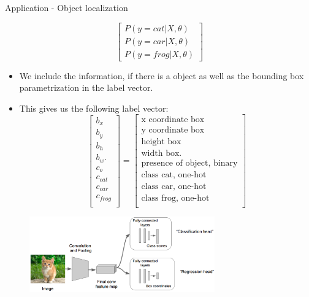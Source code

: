\begin{vbframe}{Application - Object localization}
\begin{itemize}
$$            \begin{bmatrix}
            P(y = cat| X, \theta)\\
            P(y = car| X, \theta)\\
            P(y = frog| X, \theta)
            \end{bmatrix}
            $$
                \end{itemize}
            \framebreak
            \begin{itemize}
            \item We include the information, if there is a object as well as the bounding box parametrization in the label vector.
            \item This gives us the following label vector:
                $$
                \begin{bmatrix}
            b_x\\
            b_y \\
            b_h \\
            b_w.\\
            c_o \\
            c_{cat} \\
            c_{car} \\
            c_{frog} \\
            \end{bmatrix} =             
                \begin{bmatrix}
            \text{x coordinate box}\\
            \text{y coordinate box} \\
            \text{height box} \\
            \text{width box}.\\
            \text{presence of object, binary} \\
            \text{class cat, one-hot} \\
            \text{class car, one-hot}\\
            \text{class frog, one-hot} \\
            \end{bmatrix}
            $$
                \end{itemize}
            \framebreak
            \begin{figure}
            \centering
            \includegraphics[width=8cm]{figure/naive_localization.png}

\end{figure}
\end{vbframe}
